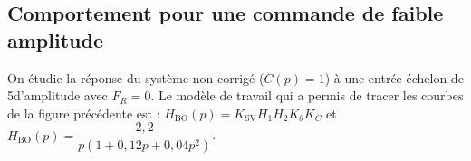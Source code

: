 %
%
%
%
%
%

\subsection*{Comportement pour une commande de faible amplitude}
\ifprof
\else
On étudie la réponse du système non corrigé ($C(p) = 1$) à une entrée échelon de 5\degres\;d’amplitude avec $F_R = 0$.
Le modèle de travail qui a permis de tracer les courbes de la figure précédente est :
$H_{\text{BO}}(p)=K_{\text{SV}} H_1 H_2 K_{\theta} K_C$ et $H_{\text{BO}}(p)=\dfrac{2,2}{p\left(1+0,12p + 0,04 p ^2  \right)}$.
\fi

